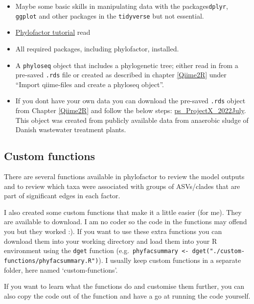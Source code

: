 \documentclass[
]{book}
\providecommand{\tightlist}{%
  \setlength{\itemsep}{0pt}\setlength{\parskip}{0pt}}
\begin{document}
\begin{itemize}
\tightlist
\item
  Maybe some basic skills in manipulating data with the packages\texttt{dplyr}, \texttt{ggplot} and other packages in the \texttt{tidyverse} but not essential.\\
\item
  \href{https://docs.wixstatic.com/ugd/0119a1_099ae20df8424af9a38585dcebc0d45a.pdf}{Phylofactor tutorial} read\\
\item
  All required packages, including phylofactor, installed.\\
\item
  A \texttt{phyloseq} object that includes a phylogenetic tree; either read in from a pre-saved \texttt{.rds} file or created as described in chapter \ref{Qiime2R} under ``Import qiime-files and create a phyloseq object''.\\
\item
  If you dont have your own data you can download the pre-saved \texttt{.rds} object from Chapter \ref{Qiime2R} and follow the below steps: \href{./ps_ProjectX_2022July}{ps\_ProjectX\_2022July}. This object was created from publicly available data from anaerobic sludge of Danish wastewater treatment plants.
\end{itemize}

\hypertarget{custom-functions}{%
\subsection{Custom functions}\label{custom-functions}}

There are several functions available in phylofactor to review the model outputs and to review which taxa were associated with groups of ASVs/clades that are part of significant edges in each factor.

I also created some custom functions that make it a little easier (for me). They are available to download. I am no coder so the code in the functions may offend you but they worked :). If you want to use these extra functions you can download them into your working directory and load them into your R environment using the \texttt{dget} function (e.g.~\texttt{phyfacsummary\ \textless{}-\ dget("./custom-functions/phyfacsummary.R")}). I usually keep custom functions in a separate folder, here named `custom-functions'.

If you want to learn what the functions do and customise them further, you can also copy the code out of the function and have a go at running the code yourself.
\end{document}
